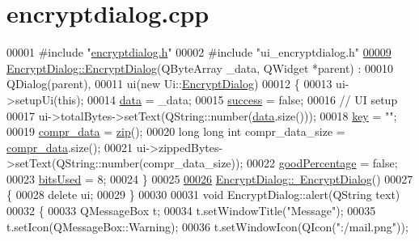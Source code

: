 \hypertarget{encryptdialog_8cpp_source}{\section{encryptdialog.\-cpp}
}

\begin{DoxyCode}
00001 \textcolor{preprocessor}{#include "\hyperlink{encryptdialog_8h}{encryptdialog.h}"}
00002 \textcolor{preprocessor}{#include "ui\_encryptdialog.h"}
\hypertarget{encryptdialog_8cpp_source_l00009}{}\hyperlink{class_encrypt_dialog_ab57e8b3a0d00c977e81f3b356657524e}{00009} \hyperlink{class_encrypt_dialog_ab57e8b3a0d00c977e81f3b356657524e}{EncryptDialog::EncryptDialog}(QByteArray \_data, QWidget *parent) :
00010     QDialog(parent),
00011     ui(new Ui::\hyperlink{class_encrypt_dialog}{EncryptDialog})
00012 \{
00013     ui->setupUi(\textcolor{keyword}{this});
00014     \hyperlink{class_encrypt_dialog_acf3a8bbce90d99ef17fec093c35b1008}{data} = \_data;
00015     \hyperlink{class_encrypt_dialog_ada4900bcd40894d9c098c65aa4066ac9}{success} = \textcolor{keyword}{false};
00016     \textcolor{comment}{// UI setup}
00017     ui->totalBytes->setText(QString::number(\hyperlink{class_encrypt_dialog_acf3a8bbce90d99ef17fec093c35b1008}{data}.size()));
00018     \hyperlink{class_encrypt_dialog_a1afdef3c665fb0d0fae06d1df8e84951}{key} = \textcolor{stringliteral}{""};
00019     \hyperlink{class_encrypt_dialog_a3e8998aa39696cbd1242f6420ef18143}{compr\_data} = \hyperlink{class_encrypt_dialog_a2bff820a3df4ddc36ecb07ed74b7138a}{zip}();
00020     \textcolor{keywordtype}{long} \textcolor{keywordtype}{long} \textcolor{keywordtype}{int} compr\_data\_size = \hyperlink{class_encrypt_dialog_a3e8998aa39696cbd1242f6420ef18143}{compr\_data}.size();
00021     ui->zippedBytes->setText(QString::number(compr\_data\_size));
00022     \hyperlink{class_encrypt_dialog_a0c821b893cfddd7a6c07bbd270ba49e9}{goodPercentage} = \textcolor{keyword}{false};
00023     \hyperlink{class_encrypt_dialog_abf638fea37fbdbaba215954e2e239860}{bitsUsed} = 8;
00024 \}
00025 
\hypertarget{encryptdialog_8cpp_source_l00026}{}\hyperlink{class_encrypt_dialog_a466e283080f87ee50f172052e43e38b6}{00026} \hyperlink{class_encrypt_dialog_a466e283080f87ee50f172052e43e38b6}{EncryptDialog::~EncryptDialog}()
00027 \{
00028     \textcolor{keyword}{delete} ui;
00029 \}
00030 
00031 \textcolor{keywordtype}{void} EncryptDialog::alert(QString text)
00032 \{
00033     QMessageBox t;
00034     t.setWindowTitle(\textcolor{stringliteral}{"Message"});
00035     t.setIcon(QMessageBox::Warning);
00036     t.setWindowIcon(QIcon(\textcolor{stringliteral}{":/mail.png"}));

\end{DoxyCode}
